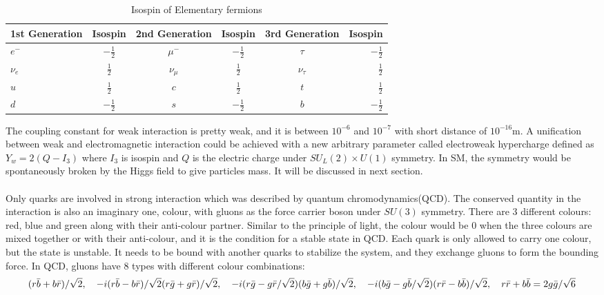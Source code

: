\begin{table}[h]
	\caption{Isospin of Elementary fermions}
	\renewcommand{\arraystretch}{1.2}
	\centering
	\begin{tabular}{l c c c c r}
		\hline
		\hline
		1st Generation &Isospin        &2nd Generation    &Isospin        &3rd Generation   &Isospin\\
		\hline
		$e^-$          &$-\frac{1}{2}$ &$\mu^-$           &$-\frac{1}{2}$ &$\tau$           &$-\frac{1}{2}$\\
		\hline
		$\nu_e$        &$\frac{1}{2}$  &$\nu_\mu$         &$\frac{1}{2}$  &$\nu_\tau$       &$\frac{1}{2}$\\
		\hline
		$u$            &$\frac{1}{2}$  &$c$               &$\frac{1}{2}$  &$t$              &$\frac{1}{2}$\\
		\hline
		$d$            &$-\frac{1}{2}$ &$s$               &$-\frac{1}{2}$ &$b$              &$-\frac{1}{2}$\\
		\hline

	\end{tabular}
    \label{Tab:isospin}
\end{table}
The coupling constant for weak interaction is pretty weak, and it is between $10^{-6}$ and $10^{-7}$ with short distance of $10^{-16}$m.
A unification between weak and electromagnetic interaction could be achieved with a new arbitrary parameter called electroweak hypercharge defined as $Y_w=2 (Q-I_3)$ where $I_3$ is isospin and $Q$ is the electric charge under $SU_L(2)\times U(1)$ symmetry.  In SM, the symmetry would be spontaneously broken by the Higgs field to give particles mass. It will be discussed in next section.
\\
\\Only quarks are involved in strong interaction which was described by quantum chromodynamics(QCD). The conserved quantity in the interaction is also an imaginary one, colour, with gluons as the force carrier boson under $SU(3)$ symmetry. There are 3 different colours: red, blue and green along with their anti-colour partner. Similar to the principle of light, the colour would be 0 when the three colours are mixed together or with their anti-colour, and it is the condition for a stable state in QCD. Each quark is only allowed to carry one colour, but the state is unstable. It needs to be bound with another quarks to stabilize the system, and they exchange gluons to form the bounding force. In QCD, gluons have 8 types with different colour combinations:
\begin{equation}
         (r\bar{b}+b\bar{r})/\sqrt{2}, \quad -i(r\bar{b}-b\bar{r})/\sqrt{2}  \\
         (r\bar{g}+g\bar{r})/\sqrt{2}, \quad -i(r\bar{g}-g\bar{r}/\sqrt{2})  \\
          (b\bar{g}+g\bar{b})/\sqrt{2},\quad -i(b\bar{g}-g\bar{b}/\sqrt{2})   \\
          (r\bar{r}-b\bar{b})/\sqrt{2},\quad  r\bar{r}+b\bar{b}=2g\bar{g}/\sqrt{6}
\end{equation}
